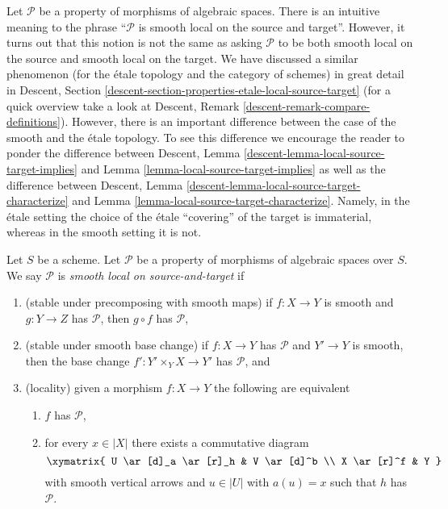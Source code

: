 \noindent
Let $\mathcal{P}$ be a property of morphisms of algebraic spaces. There is an
intuitive meaning to the phrase ``$\mathcal{P}$ is smooth local on the
source and target''. However, it turns out that this notion is not
the same as asking $\mathcal{P}$ to be both smooth
local on the source and smooth local on the target.
We have discussed a similar phenomenon (for the \'etale topology and
the category of schemes) in great detail in
Descent, Section \ref{descent-section-properties-etale-local-source-target}
(for a quick overview take a look at
Descent, Remark \ref{descent-remark-compare-definitions}).
However, there is an important difference between the case of the smooth
and the \'etale topology. To see this difference we encourage the reader
to ponder the difference between
Descent, Lemma \ref{descent-lemma-local-source-target-implies}
and
Lemma \ref{lemma-local-source-target-implies}
as well as the difference between
Descent, Lemma \ref{descent-lemma-local-source-target-characterize}
and
Lemma \ref{lemma-local-source-target-characterize}.
Namely, in the \'etale setting the choice of the \'etale ``covering'' of the
target is immaterial, whereas in the smooth setting it is not.

\begin{definition}
\label{definition-local-source-target}
Let $S$ be a scheme.
Let $\mathcal{P}$ be a property of morphisms of algebraic spaces over $S$.
We say $\mathcal{P}$ is {\it smooth local on source-and-target} if
\begin{enumerate}
\item (stable under precomposing with smooth maps)
if $f : X \to Y$ is smooth and $g : Y \to Z$ has $\mathcal{P}$,
then $g \circ f$ has $\mathcal{P}$,
\item (stable under smooth base change)
if $f : X \to Y$ has $\mathcal{P}$ and $Y' \to Y$ is smooth, then
the base change $f' : Y' \times_Y X \to Y'$ has $\mathcal{P}$, and
\item (locality) given a morphism $f : X \to Y$ the following are
equivalent
\begin{enumerate}
\item $f$ has $\mathcal{P}$,
\item for every $x \in |X|$ there exists a commutative diagram
$$
\xymatrix{
U \ar[d]_a \ar[r]_h & V \ar[d]^b \\
X \ar[r]^f & Y
}
$$
with smooth vertical arrows and $u \in |U|$ with $a(u) = x$ such that
$h$ has $\mathcal{P}$.
\end{enumerate}
\end{enumerate}
\end{definition}

